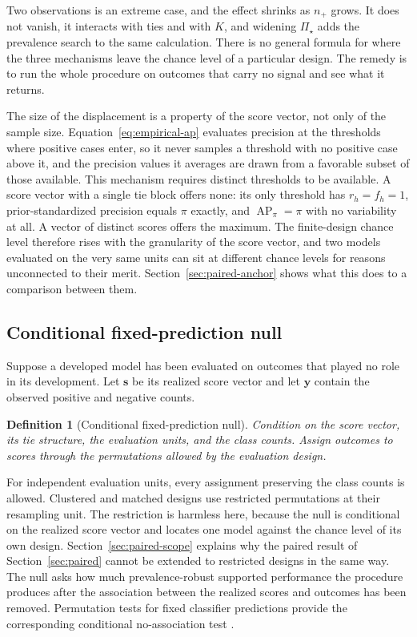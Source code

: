 \documentclass[11pt]{article}
\newcommand{\AP}{\operatorname{AP}}
\newcommand{\PSet}{\Pi_\star}
\newtheorem{definition}{Definition}
\theoremstyle{remark}
\begin{document}
Two observations is an extreme case, and the effect shrinks as $n_+$ grows. It does not vanish, it interacts with ties and with $K$, and widening $\PSet$ adds the prevalence search to the same calculation. There is no general formula for where the three mechanisms leave the chance level of a particular design. The remedy is to run the whole procedure on outcomes that carry no signal and see what it returns.

The size of the displacement is a property of the score vector, not only of the sample size. Equation~\eqref{eq:empirical-ap} evaluates precision at the thresholds where positive cases enter, so it never samples a threshold with no positive case above it, and the precision values it averages are drawn from a favorable subset of those available. This mechanism requires distinct thresholds to be available. A score vector with a single tie block offers none: its only threshold has $r_h=f_h=1$, prior-standardized precision equals $\pi$ exactly, and $\AP_\pi=\pi$ with no variability at all. A vector of distinct scores offers the maximum. The finite-design chance level therefore rises with the granularity of the score vector, and two models evaluated on the very same units can sit at different chance levels for reasons unconnected to their merit. Section~\ref{sec:paired-anchor} shows what this does to a comparison between them.

\subsection{Conditional fixed-prediction null}

Suppose a developed model has been evaluated on outcomes that played no role in its development. Let $\mathbf{s}$ be its realized score vector and let $\mathbf{y}$ contain the observed positive and negative counts.

\begin{definition}[Conditional fixed-prediction null]
Condition on the score vector, its tie structure, the evaluation units, and the class counts. Assign outcomes to scores through the permutations allowed by the evaluation design.
\end{definition}

For independent evaluation units, every assignment preserving the class counts is allowed. Clustered and matched designs use restricted permutations at their resampling unit. The restriction is harmless here, because the null is conditional on the realized score vector and locates one model against the chance level of its own design. Section~\ref{sec:paired-scope} explains why the paired result of Section~\ref{sec:paired} cannot be extended to restricted designs in the same way. The null asks how much prevalence-robust supported performance the procedure produces after the association between the realized scores and outcomes has been removed. Permutation tests for fixed classifier predictions provide the corresponding conditional no-association test \cite{ojala2010permutation}.
\end{document}
